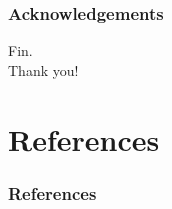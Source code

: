 \documentclass{beamer}
\begin{document}



\begin{frame}
    \frametitle{Acknowledgements}
    
\end{frame}


\begin{frame}
    \center
    \huge{Fin.}\\
    \normalsize{Thank you!}
\end{frame}


\section{References}

\begin{frame}[allowframebreaks]
    \frametitle{References}

    
    
\end{frame}
\end{document}
